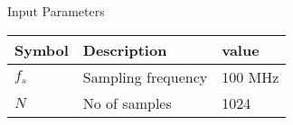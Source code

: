 \setlength{\arrayrulewidth}{0.3mm}
\setlength{\tabcolsep}{12pt}
\renewcommand{\arraystretch}{1.3}


\begin{center}
\caption{Input Parameters}
\begin{tabular}{ |p{1.7cm}|p{1.7cm}|p{1.7cm}|  }

\hline
 {Symbol}&{Description} & {value}\\
\hline
$f_s$ & Sampling frequency & 100 MHz\\
\hline
$N$ & No of samples  & 1024\\
\hline

\end{tabular}
\end{center}
